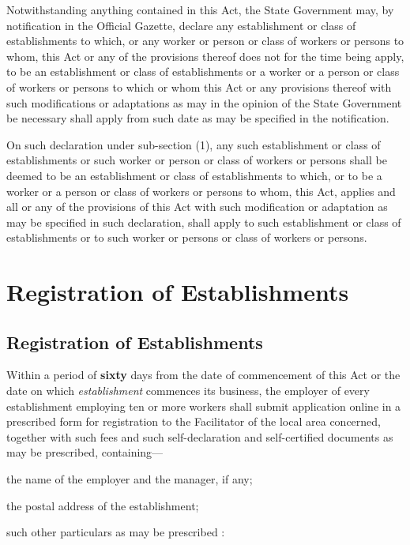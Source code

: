 \documentclass[gaz8,ordinance]{mhact}
\begin{document}
      \begin{subsectionlist}
    
    \item Notwithstanding anything contained in this Act, the State 
Government may, by notification in the Official Gazette, declare any 
establishment or class of establishments to which, or any worker or person 
or class of workers or persons to whom, this Act or any of the provisions 
thereof does not for the time being apply, to be an establishment or class of 
establishments or a worker or a person or class of workers or persons to 
which or whom this Act or any provisions thereof with such modifications or 
adaptations as may in the opinion of the State Government be necessary 
shall apply from such date as may be specified in the notification.
    \item On such declaration under sub-section (1), any such establishment 
or class of establishments or such worker or person or class of workers or persons shall be deemed to be an establishment or class of establishments to 
which, or to be a worker or a person or class of workers or persons to whom, 
this Act, applies and all or any of the provisions of this Act with such 
modification or adaptation as may be specified in such declaration, shall apply 
to such establishment or class of establishments or to such worker or persons 
or class of workers or persons.

       \end{subsectionlist}
    
        \chapter{Registration of Establishments} 
        
        \section{Registration of Establishments} 
        
      \begin{subsectionlist}
    
    \item Within a period of 
   \textbf{sixty}
   days from the date of commencement of this Act or the date on which 
   \emph{establishment}
   commences its business, the employer of every establishment employing ten or more workers shall submit application online in a prescribed form for registration to the Facilitator of the local area concerned, together with such fees and such self-declaration and self-certified documents as may be prescribed, containing---

      \begin{clause}
    
    \item the name of the employer and the manager, if any;
    \item the postal address of the establishment;
    \item such other particulars as may be prescribed :
       \end{clause}
    
       \end{subsectionlist}
    
\end{document}
